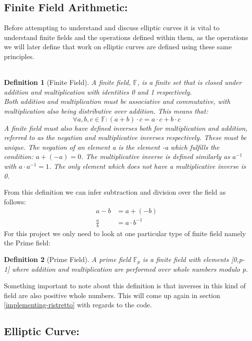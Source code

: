 \documentclass{article}
\newtheorem{definition}{Definition}[section]
\newcommand{\eq}[1]{\begin{equation*}\begin{split}#1\end{split}\end{equation*}}
\begin{document}
\subsection{Finite Field Arithmetic:} \label{Finite Field Arithmetic}

Before attempting to understand and discuss elliptic curves it is vital to understand finite fields and the operations defined within them, as the operations we will later define that work on elliptic curves are defined using these same principles. \\\\

\begin{definition}[Finite Field]
	A finite field, $\mathbb{F}$, is a finite set that is closed under addition and multiplication with identities 0 and 1 respectively.\\ Both addition and multiplication must be associative and commutative, with multiplication also being distributive over addition. This means that:
	$$\forall a,b,c \in \mathbb{F}: (a+b)\cdot c = a\cdot c + b\cdot c$$
	A finite field must also have defined inverses both for multiplication and addition, referred to as the negation and multiplicative inverses respectively. These must be unique. The negation of an element a is the element -a which fulfills the condition: $a + (-a) = 0$. The multiplicative inverse is defined similarly as $a^{-1}$ with $a\cdot a^{-1} = 1$. The only element which does not have a multiplicative inverse is 0.
\end{definition}
\noindent

From this definition we can infer subtraction and division over the field as follows:
\eq{
	a-b         &= a + (-b) \\
	\frac{a}{b} &= a \cdot b^{-1}
}
For this project we only need to look at one particular type of finite field namely the Prime field:
\begin{definition}[Prime Field]
	A prime field $\mathbb{F}_p$ is a finite field with elements [0,p-1] where addition and multiplication are performed over whole numbers modulo p.
\end{definition}
\noindent

Something important to note about this definition is that inverses in this kind of field are also positive whole numbers. This will come up again in section \ref{implementing-ristretto} with regards to the code.

\subsection{Elliptic Curve:}\label{elliptic-curves}
\end{document}
